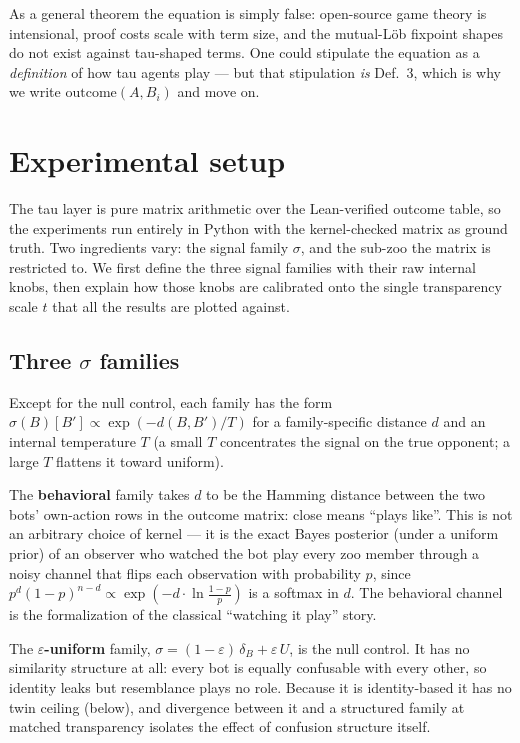\documentclass[11pt]{article}
\begin{document}
As a general theorem the equation is simply false: open-source game theory
is intensional, proof costs scale with term size, and the mutual-L\"ob
fixpoint shapes do not exist against tau-shaped terms. One could stipulate
the equation as a \emph{definition} of how tau agents play --- but that
stipulation \emph{is} Def.~3, which is why we write
$\mathrm{outcome}(A, B_i)$ and move on.

\section{Experimental setup}

The tau layer is pure matrix arithmetic over the Lean-verified outcome
table, so the experiments run entirely in Python with the kernel-checked
matrix as ground truth. Two ingredients vary: the signal family
$\sigma$, and the sub-zoo the matrix is restricted to. We first define the
three signal families with their raw internal knobs, then explain how those
knobs are calibrated onto the single transparency scale $t$ that all the
results are plotted against.

\subsection{Three $\sigma$ families}

Except for the null control, each family has the form
$\sigma(B)[B'] \propto \exp(-d(B,B')/T)$ for a family-specific distance
$d$ and an internal temperature $T$ (a small $T$ concentrates the signal
on the true opponent; a large $T$ flattens it toward uniform).

The \textbf{behavioral} family takes $d$ to be the Hamming distance between
the two bots' own-action rows in the outcome matrix: close means ``plays
like''. This is not an arbitrary choice of kernel --- it is the exact Bayes
posterior (under a uniform prior) of an observer who watched the bot play
every zoo member through a noisy channel that flips each observation with
probability $p$, since $p^d(1-p)^{n-d} \propto \exp(-d \cdot
\ln\frac{1-p}{p})$ is a softmax in $d$. The behavioral channel is the
formalization of the classical ``watching it play'' story.

The \textbf{$\varepsilon$-uniform} family,
$\sigma = (1-\varepsilon)\,\delta_B + \varepsilon\,U$, is the null control.
It has no similarity structure at all: every bot is equally confusable with
every other, so identity leaks but resemblance plays no role. Because it is
identity-based it has no twin ceiling (below), and divergence between it
and a structured family at matched transparency isolates the effect of
confusion structure itself.
\end{document}
